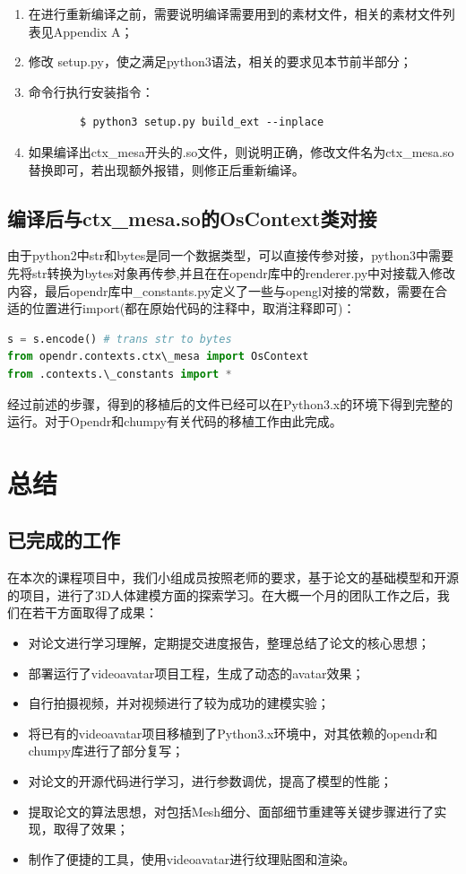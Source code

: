 \documentclass{article}
\begin{document}
\begin{enumerate}
	\item 在进行重新编译之前，需要说明编译需要用到的素材文件，相关的素材文件列表见Appendix A；
	\item 修改 setup.py，使之满足python3语法，相关的要求见本节前半部分；
	\item 命令行执行安装指令：
	\begin{lstlisting} 
		$ python3 setup.py build_ext --inplace
	\end{lstlisting}
	\item 如果编译出ctx\_mesa开头的.so文件，则说明正确，修改文件名为ctx\_mesa.so替换即可，若出现额外报错，则修正后重新编译。
\end{enumerate}

\subsection{编译后与ctx\_mesa.so的OsContext类对接}
由于python2中str和bytes是同一个数据类型，可以直接传参对接，python3中需要先将str转换为bytes对象再传参,并且在在opendr库中的renderer.py中对接载入修改内容，最后opendr库中\_constants.py定义了一些与opengl对接的常数，需要在合适的位置进行import(都在原始代码的注释中，取消注释即可)：
\begin{lstlisting}[language=python]
s = s.encode() # trans str to bytes
from opendr.contexts.ctx\_mesa import OsContext
from .contexts.\_constants import *
\end{lstlisting}

经过前述的步骤，得到的移植后的文件已经可以在Python3.x的环境下得到完整的运行。对于Opendr和chumpy有关代码的移植工作由此完成。
\section{总结}
\subsection{已完成的工作}
在本次的课程项目中，我们小组成员按照老师的要求，基于论文\cite{smpl}的基础模型和开源的\cite{paper1code}项目，进行了3D人体建模方面的探索学习。在大概一个月的团队工作之后，我们在若干方面取得了成果：

\begin{itemize}
	\item 对论文\cite{smpl,paper1,paper2}进行学习理解，定期提交进度报告，整理总结了论文的核心思想；
	\item 部署运行了videoavatar\cite{paper1code}项目工程，生成了动态的avatar效果；
	\item 自行拍摄视频，并对视频进行了较为成功的建模实验；
	\item 将已有的videoavatar项目移植到了Python3.x环境中，对其依赖的opendr和chumpy库进行了部分复写；
	\item 对论文\cite{paper1}的开源代码进行学习，进行参数调优，提高了模型的性能；
	\item 提取论文\cite{paper2}的算法思想，对包括Mesh细分、面部细节重建等关键步骤进行了实现，取得了效果；
	\item 制作了便捷的工具，使用videoavatar进行纹理贴图和渲染。
\end{itemize}
\end{document}
